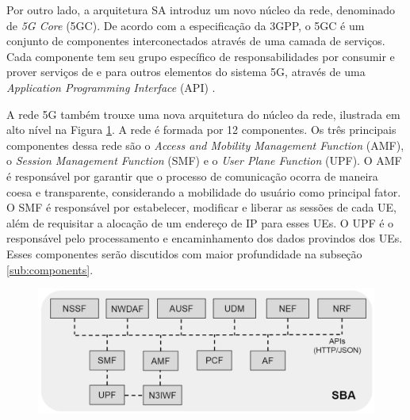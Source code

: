 Por outro lado, a arquitetura SA introduz um novo núcleo da rede, denominado de \textit{5G Core} (5GC).
De acordo com a especificação da 3GPP, o 5GC é um conjunto de componentes interconectados através de uma camada de serviços. Cada componente tem seu grupo específico de responsabilidades por consumir e prover serviços de e para outros elementos do sistema 5G, através de uma \textit{Application Programming Interface} (API) \cite{3gpp.21.205}.

A rede 5G também trouxe uma nova arquitetura do núcleo da rede, ilustrada em alto nível na Figura \ref{fig:5Gcore}. A rede é formada por 12 componentes. Os três principais componentes dessa rede são o \textit{Access and Mobility Management Function} (AMF), o \textit{Session Management Function} (SMF) e o \textit{User Plane Function} (UPF).
O AMF é responsável por garantir que o processo de comunicação ocorra de maneira coesa e transparente, considerando a mobilidade do usuário como principal fator.
O SMF é responsável por estabelecer, modificar e liberar as sessões de cada UE, além de requisitar a alocação de um endereço de IP para esses UEs.
O UPF é o responsável pelo processamento e encaminhamento dos dados provindos dos UEs. Esses componentes serão discutidos com maior profundidade na subseção \ref{sub:components}.

\begin{figure}[!ht]
    \centering
    \includegraphics[width=1\textwidth]{TG2/Chapters/Background/Figures/Background-Core5G.png}
    \label{fig:5Gcore}
\end{figure}

